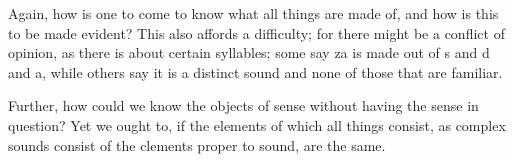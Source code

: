 \documentclass{article}
\begin{document}
Again, how is one to come to know what all things are made of, and how is this to be made evident? This also affords a difficulty; for there might be a conflict of opinion, as there is about certain syllables; some say za is made out of s and d and a, while others say it is a distinct sound and none of those that are familiar.

Further, how could we know the objects of sense without having the sense in question? Yet we ought to, if the elements of which all things consist, as complex sounds consist of the clements proper to sound, are the same.
\end{document}
